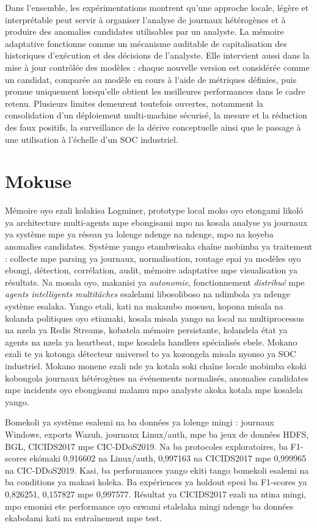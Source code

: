 \documentclass[12pt,a4paper,oneside]{report}
\newcommand{\logminer}{Logminer}
\begin{document}
Dans l'ensemble, les expérimentations montrent qu'une approche locale, légère et interprétable peut servir à organiser l'analyse de journaux hétérogènes et à produire des anomalies candidates utilisables par un analyste. La mémoire adaptative fonctionne comme un mécanisme auditable de capitalisation des historiques d'exécution et des décisions de l'analyste. Elle intervient aussi dans la mise à jour contrôlée des modèles : chaque nouvelle version est considérée comme un candidat, comparée au modèle en cours à l'aide de métriques définies, puis promue uniquement lorsqu'elle obtient les meilleures performances dans le cadre retenu. Plusieurs limites demeurent toutefois ouvertes, notamment la consolidation d'un déploiement multi-machine sécurisé, la mesure et la réduction des faux positifs, la surveillance de la dérive conceptuelle ainsi que le passage à une utilisation à l'échelle d'un SOC industriel.

\chapter*{Mokuse}

Mémoire oyo ezali kolakisa \logminer{}, prototype local moko oyo etongami likoló ya architecture multi-agents mpe ebongisami mpo na kosala analyse ya journaux ya système mpe ya réseau ya lolenge ndenge na ndenge, mpo na koyeba anomalies candidates. Système yango etambwisaka chaîne mobimba ya traitement : collecte mpe parsing ya journaux, normalisation, routage epai ya modèles oyo ebongi, détection, corrélation, audit, mémoire adaptative mpe visualisation ya résultats. Na mosala oyo, makanisi ya \textit{autonomie}, fonctionnement \textit{distribué} mpe \textit{agents intelligents multitâches} esalelami libosoliboso na ndimbola ya ndenge système esalaka. Yango etali, kati na makambo mosusu, kopona misala na kolanda politiques oyo etiamaki, kosala misala yango na local na multiprocessus na nzela ya Redis Streams, kobatela mémoire persistante, kolandela état ya agents na nzela ya heartbeat, mpe kosalela handlers spécialisés ebele. Mokano ezali te ya kotonga détecteur universel to ya kozongela misala nyonso ya SOC industriel. Mokano monene ezali nde ya kotala soki chaîne locale mobimba ekoki kobongola journaux hétérogènes na événements normalisés, anomalies candidates mpe incidents oyo ebongisami malamu mpo analyste akoka kotala mpe kosalela yango.

Bomekoli ya système esalemi na ba données ya lolenge mingi : journaux Windows, exports Wazuh, journaux Linux/auth, mpe ba jeux de données HDFS, BGL, CICIDS2017 mpe CIC-DDoS2019. Na ba protocoles exploratoires, ba F1-scores ekómaki 0,916602 na Linux/auth, 0,997163 na CICIDS2017 mpe 0,999965 na CIC-DDoS2019. Kasi, ba performances yango ekiti tango bomekoli esalemi na ba conditions ya makasi koleka. Ba expériences ya holdout epesi ba F1-scores ya 0,826251, 0,157827 mpe 0,997577. Résultat ya CICIDS2017 ezali na ntina mingi, mpo emonisi ete performance oyo ezwami etalelaka mingi ndenge ba données ekabolami kati na entraînement mpe test.
\end{document}
